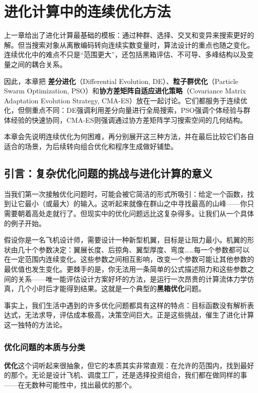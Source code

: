 \documentclass[lang=cn,zihao=-4,a4paper,fontset=windows]{beautybook}
\begin{document}
\chapter{进化计算中的连续优化方法}

上一章给出了进化计算最基础的模板：通过种群、选择、交叉和变异来搜索更好的解。但当搜索对象从离散编码转向连续实数变量时，算法设计的重点也随之变化。连续优化中的难点不只是“范围更大”，还包括黑箱评估、不可导、多峰结构以及变量之间的耦合关系。

因此，本章把 \textbf{差分进化}（Differential Evolution, DE）、\textbf{粒子群优化}（Particle Swarm Optimization, PSO）和\textbf{协方差矩阵自适应进化策略}（Covariance Matrix Adaptation Evolution Strategy, CMA-ES）放在一起讨论。它们都服务于连续优化，但侧重点不同：DE强调利用差分向量进行全局搜索，PSO强调个体经验与群体经验的快速协同，CMA-ES则强调通过协方差矩阵学习搜索空间的几何结构。

本章会先说明连续优化为何困难，再分别展开这三种方法，并在最后比较它们各自适合的场景，为后续转向组合优化和程序生成做好铺垫。

\section{引言：复杂优化问题的挑战与进化计算的意义}

当我们第一次接触优化问题时，可能会被它简洁的形式所吸引：给定一个函数，找到让它最小（或最大）的输入。这听起来就像在群山之中寻找最高的山峰——你只需要朝着高处走就行了。但现实中的优化问题远比这复杂得多。让我们从一个具体的例子开始。

假设你是一名飞机设计师，需要设计一种新型机翼，目标是让阻力最小。机翼的形状由几十个参数决定：翼展长度、后掠角、翼型厚度、弯度……每一个参数都可以在一定范围内连续变化。这些参数之间相互影响，改变一个参数可能让其他参数的最优值也发生变化。更棘手的是，你无法用一条简单的公式描述阻力和这些参数之间的关系——唯一能评估设计方案好坏的方法，是运行一次昂贵的计算流体力学仿真，几个小时后才能得到结果。这就是一个典型的\textbf{黑箱优化}问题。

事实上，我们生活中遇到的许多优化问题都具有这样的特点：目标函数没有解析表达式，无法求导，评估成本极高，决策空间巨大。正是这些挑战，催生了进化计算这一独特的方法论。

\subsection{优化问题的本质与分类}

\textbf{优化}这个词听起来很抽象，但它的本质其实非常直观：在允许的范围内，找到最好的那个。无论是设计飞机、调度工厂，还是选择投资组合，我们都在做同样的事——在无数种可能性中，找出最优的那个。
\end{document}
